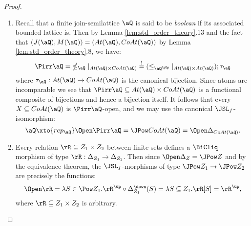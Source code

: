 \documentclass{article}
\begin{document}
\begin{proof}
\item
\begin{enumerate}
\item
Recall that a finite join-semilattice $\aQ$ is said to be \emph{boolean} if its associated bounded lattice is. Then by Lemma \ref{lem:std_order_theory}.13 and the fact that $(J(\aQ),M(\aQ)) = (At(\aQ),CoAt(\aQ))$ by Lemma \ref{lem:std_order_theory}.8, we have:
\[
\Pirr\aQ
= \; \nleq_\aQ |_{At(\aQ) \times CoAt(\aQ)} 
\stackrel{!}{=} (\leq_{\aQ^{\pOp}} |_{At(\aQ) \times At(\aQ)}) ; \tau_\aQ
\]
where $\tau_\aQ : At(\aQ) \to CoAt(\aQ)$ is the canonical bijection. Since atoms are incomparable we see that $\Pirr\aQ \subseteq At(\aQ) \times CoAt(\aQ)$ is a functional composite of bijections and hence a bijection itself. It follows that every $X \subseteq CoAt(\aQ)$ is $\Pirr\aQ$-open, and we may use the canonical $\JSL_f$-isomorphism:
\[
\aQ \xto{rep_\aQ} \Open\Pirr\aQ = \JPow CoAt(\aQ) = \Open \Delta_{CoAt(\aQ)}.
\]


\item
Every relation $\rR \subseteq Z_1 \times Z_2$ between finite sets defines a $\BiCliq$-morphism of type $\rR : \Delta_{Z_1} \to \Delta_{Z_2}$. Then since $\Open\Delta_Z = \JPow Z$ and by the equivalence theorem, the $\JSL_f$-morphisms of type $\JPow Z_1 \to \JPow Z_2$ are precisely the functions:
\[
\Open\rR
= \lambda S \in \Pow Z_1. \rR^\up \circ \Delta_{Z_1}^\down(S)
= \lambda S \subseteq Z_1. \rR[S]
= \rR^\up,
\]
where $\rR \subseteq Z_1 \times Z_2$ is arbitrary.


\end{enumerate}
\end{proof}
\end{document}
